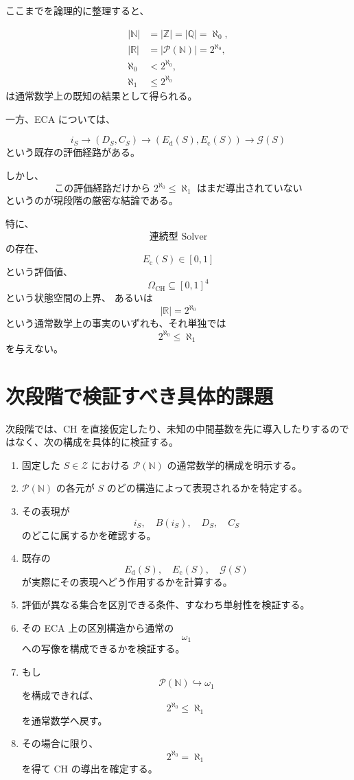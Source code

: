 \documentclass[a4paper,11pt]{article}
\newcommand{\N}{\mathbb{N}}
\newcommand{\Z}{\mathbb{Z}}
\newcommand{\Q}{\mathbb{Q}}
\newcommand{\R}{\mathbb{R}}
\newcommand{\Zset}{\mathcal{Z}}
\newcommand{\Pow}{\mathcal{P}}
\begin{document}
ここまでを論理的に整理すると、

\[
\boxed{
\begin{aligned}
|\N|&=|\Z|=|\Q|=\aleph_0,\\
|\R|&=|\Pow(\N)|=2^{\aleph_0},\\
\aleph_0&<2^{\aleph_0},\\
\aleph_1&\leq2^{\aleph_0}
\end{aligned}
}
\]
は通常数学上の既知の結果として得られる。

一方、ECA については、

\[
\boxed{
i_S
\longrightarrow
(D_S,C_S)
\longrightarrow
(E_{\mathrm{d}}(S),E_{\mathrm c}(S))
\longrightarrow
\mathcal G(S)
}
\]
という既存の評価経路がある。

しかし、
\[
\boxed{
\text{この評価経路だけから }
2^{\aleph_0}\leq\aleph_1
\text{ はまだ導出されていない}
}
\]
というのが現段階の厳密な結論である。

特に、
\[
\text{連続型 Solver}
\]
の存在、
\[
E_{\mathrm c}(S)\in[0,1]
\]
という評価値、
\[
\Omega_{\mathrm{CH}}\subseteq[0,1]^4
\]
という状態空間の上界、
あるいは
\[
|\R|=2^{\aleph_0}
\]
という通常数学上の事実のいずれも、それ単独では
\[
2^{\aleph_0}\leq\aleph_1
\]
を与えない。

\section{次段階で検証すべき具体的課題}

次段階では、CH を直接仮定したり、未知の中間基数を先に導入したりするのではなく、次の構成を具体的に検証する。

\begin{enumerate}
\item 固定した $S\in\Zset$ における $\Pow(\N)$ の通常数学的構成を明示する。
\item $\Pow(\N)$ の各元が $S$ のどの構造によって表現されるかを特定する。
\item その表現が
\[
i_S,\quad B(i_S),\quad D_S,\quad C_S
\]
のどこに属するかを確認する。
\item 既存の
\[
E_{\mathrm{d}}(S),\quad E_{\mathrm c}(S),\quad\mathcal G(S)
\]
が実際にその表現へどう作用するかを計算する。
\item 評価が異なる集合を区別できる条件、すなわち単射性を検証する。
\item その ECA 上の区別構造から通常の
\[
\omega_1
\]
への写像を構成できるかを検証する。
\item もし
\[
\Pow(\N)\hookrightarrow\omega_1
\]
を構成できれば、
\[
2^{\aleph_0}\leq\aleph_1
\]
を通常数学へ戻す。
\item その場合に限り、
\[
2^{\aleph_0}=\aleph_1
\]
を得て CH の導出を確定する。
\end{enumerate}
\end{document}
